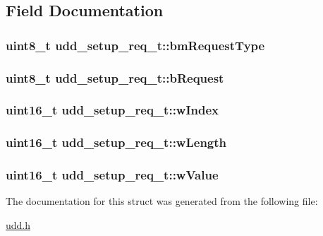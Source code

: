 \subsection{\-Field \-Documentation}
\hypertarget{structudd__setup__req__t_a40ec5987baf18ada7c852aa556102d51}{
\subsubsection[{bm\-Request\-Type}]{\setlength{\rightskip}{0pt plus 5cm}uint8\-\_\-t {\bf udd\-\_\-setup\-\_\-req\-\_\-t\-::bm\-Request\-Type}}}
\label{structudd__setup__req__t_a40ec5987baf18ada7c852aa556102d51}
\hypertarget{structudd__setup__req__t_aa6d1f4b258b1b3ddb4eb446e17d0a258}{
\subsubsection[{b\-Request}]{\setlength{\rightskip}{0pt plus 5cm}uint8\-\_\-t {\bf udd\-\_\-setup\-\_\-req\-\_\-t\-::b\-Request}}}
\label{structudd__setup__req__t_aa6d1f4b258b1b3ddb4eb446e17d0a258}
\hypertarget{structudd__setup__req__t_aac97c21729d801db81853cd5bf45c953}{
\subsubsection[{w\-Index}]{\setlength{\rightskip}{0pt plus 5cm}uint16\-\_\-t {\bf udd\-\_\-setup\-\_\-req\-\_\-t\-::w\-Index}}}
\label{structudd__setup__req__t_aac97c21729d801db81853cd5bf45c953}
\hypertarget{structudd__setup__req__t_a083a6f9b83f27aede156698631feb4f0}{
\subsubsection[{w\-Length}]{\setlength{\rightskip}{0pt plus 5cm}uint16\-\_\-t {\bf udd\-\_\-setup\-\_\-req\-\_\-t\-::w\-Length}}}
\label{structudd__setup__req__t_a083a6f9b83f27aede156698631feb4f0}
\hypertarget{structudd__setup__req__t_a2957ed930c944745d809f4dd28d46fc4}{
\subsubsection[{w\-Value}]{\setlength{\rightskip}{0pt plus 5cm}uint16\-\_\-t {\bf udd\-\_\-setup\-\_\-req\-\_\-t\-::w\-Value}}}
\label{structudd__setup__req__t_a2957ed930c944745d809f4dd28d46fc4}


\-The documentation for this struct was generated from the following file\-:\begin{DoxyCompactItemize}
\item 
\hyperlink{udd_8h}{udd.\-h}\end{DoxyCompactItemize}
